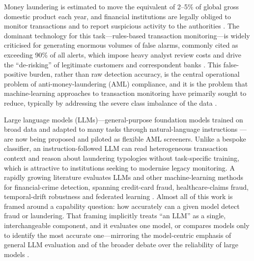 \documentclass[lineno,pdflatex,sn-basic,Numbered]{sn-jnl}
\begin{document}
Money laundering is estimated to move the equivalent of 2--5\% of global gross domestic product each year, and financial institutions are legally obliged to monitor transactions and to report suspicious activity to the authorities \cite{fatf-tbml,unodc}. The dominant technology for this task---rules-based transaction monitoring---is widely criticised for generating enormous volumes of false alarms, commonly cited as exceeding 90\% of all alerts, which impose heavy analyst review costs and drive the ``de-risking'' of legitimate customers and correspondent banks \cite{srguidance}. This false-positive burden, rather than raw detection accuracy, is the central operational problem of anti-money-laundering (AML) compliance, and it is the problem that machine-learning approaches to transaction monitoring have primarily sought to reduce, typically by addressing the severe class imbalance of the data \cite{smote,imbalance,srfraud1,srfraud2}.

Large language models (LLMs)---general-purpose foundation models trained on broad data and adapted to many tasks through natural-language instructions \cite{fewshot,foundation}---are now being proposed and piloted as flexible AML screeners. Unlike a bespoke classifier, an instruction-followed LLM can read heterogeneous transaction context and reason about laundering typologies without task-specific training, which is attractive to institutions seeking to modernise legacy monitoring. A rapidly growing literature evaluates LLMs and other machine-learning methods for financial-crime detection, spanning credit-card fraud, healthcare-claims fraud, temporal-drift robustness and federated learning \cite{srfraud1,srfraud2,srfraud3,srfraud4}. Almost all of this work is framed around a capability question: how accurately can a given model detect fraud or laundering. That framing implicitly treats ``an LLM'' as a single, interchangeable component, and it evaluates one model, or compares models only to identify the most accurate one---mirroring the model-centric emphasis of general LLM evaluation and of the broader debate over the reliability of large models \cite{helm,parrots}.
\end{document}
